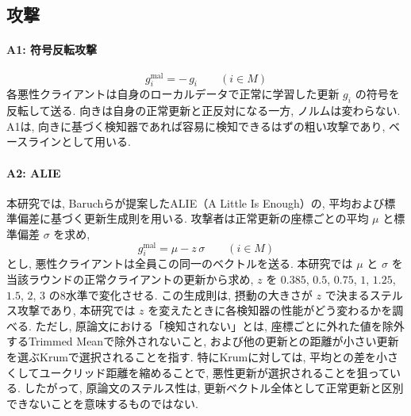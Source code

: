 \documentclass[a4j, twocolumn, dvipdfmx]{jsarticle}
\begin{document}
\subsection{攻撃}
\label{sec:attacks}

\paragraph{A1: 符号反転攻撃}
\begin{equation}
g_i^{\text{mal}} = -\,g_i \qquad (i \in M)
\end{equation}
各悪性クライアントは自身のローカルデータで正常に学習した更新 $g_i$ の符号を反転して送る. 向きは自身の正常更新と正反対になる一方, ノルムは変わらない. A1は, 向きに基づく検知器であれば容易に検知できるはずの粗い攻撃であり, ベースラインとして用いる.

\paragraph{A2: ALIE}
本研究では, Baruchら\cite{baruch2019little}が提案したALIE（A Little Is Enough）の, 平均および標準偏差に基づく更新生成則を用いる. 攻撃者は正常更新の座標ごとの平均 $\mu$ と標準偏差 $\sigma$ を求め,
\begin{equation}
g_i^{\text{mal}} = \mu - z\,\sigma \qquad (i \in M)
\label{eq:alie}
\end{equation}
とし, 悪性クライアントは全員この同一のベクトルを送る. 本研究では $\mu$ と $\sigma$ を当該ラウンドの正常クライアントの更新から求め, $z$ を $0.385$, $0.5$, $0.75$, $1$, $1.25$, $1.5$, $2$, $3$ の8水準で変化させる. この生成則は, 摂動の大きさが $z$ で決まるステルス攻撃であり, 本研究では $z$ を変えたときに各検知器の性能がどう変わるかを調べる. ただし, 原論文における「検知されない」とは, 座標ごとに外れた値を除外するTrimmed Meanで除外されないこと, および他の更新との距離が小さい更新を選ぶKrumで選択されることを指す. 特にKrumに対しては, 平均との差を小さくしてユークリッド距離を縮めることで, 悪性更新が選択されることを狙っている. したがって, 原論文のステルス性は, 更新ベクトル全体として正常更新と区別できないことを意味するものではない.
\end{document}

